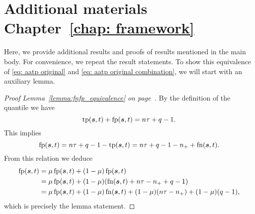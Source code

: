 \chapter{Additional materials Chapter~\ref{chap: framework}}

Here, we provide additional results and proofs of results mentioned in the main body. For convenience, we repeat the result statements. To show this equivalence of \eqref{eq: aatp original} and \eqref{eq: aatp original combination}, we will start with an auxiliary lemma.

\lemmaequivalence*
\begin{proof}[Proof Lemma~\ref{lemma:fnfp_equivalence} on page~\pageref{lemma:fnfp_equivalence}]
  By the definition of the quantile we have
  \begin{equation*}
    \operatorname{tp}(\bm{s},t)+\operatorname{fp}(\bm{s},t) = n\tau + q-1.
  \end{equation*}
  This implies
  \begin{equation*}
    \operatorname{fp}(\bm{s},t)=n\tau +q - 1-\operatorname{tp}(\bm{s},t) =n\tau+q-1-n_{+} +\operatorname{fn}(\bm{s},t).
  \end{equation*}
  From this relation we deduce
  \begin{equation*}
    \begin{aligned}
      \fp(\bm{s},t)
      & = \mu \fp(\bm{s},t) + (1 - \mu)\fp(\bm{s},t) \\
      & = \mu \fp(\bm{s},t) + (1 - \mu)\Brac{\fn(\bm{s},t) + n\tau - \npos + q - 1} \\
      & = \mu \fp(\bm{s},t) + (1 - \mu)\fn(\bm{s},t) + (1-\mu)\Brac{n\tau - \npos} + (1-\mu)\Brac{q - 1},
    \end{aligned}
  \end{equation*}
  which is precisely the lemma statement.
\end{proof}
